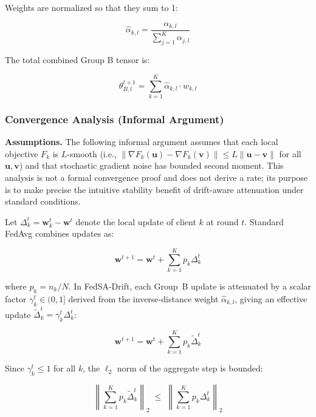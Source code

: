 \documentclass{ieeeaccess}
\newcommand{\sadrift}{FedSA-Drift}
\begin{document}
Weights are normalized so that they sum to 1:

\begin{equation}
\label{eq:norm_weight}
\hat{\alpha}_{k,l} = \frac{\alpha_{k,l}}{\sum_{j=1}^{K} \alpha_{j,l}}
\end{equation}

The total combined Group B tensor is:

\begin{equation}
\label{eq:groupB_agg}
\theta_{B,l}^{t+1} = \sum_{k=1}^{K} \hat{\alpha}_{k,l} \cdot w_{k,l}
\end{equation}

\subsubsection{Convergence Analysis (Informal Argument)}

\noindent\textbf{Assumptions.}
The following informal argument assumes that each local objective $F_k$ is $L$-smooth (i.e., $\|\nabla F_k(\mathbf{u}) - \nabla F_k(\mathbf{v})\| \le L\|\mathbf{u}-\mathbf{v}\|$ for all $\mathbf{u},\mathbf{v}$) and that stochastic gradient noise has bounded second moment. This analysis is not a formal convergence proof and does not derive a rate; its purpose is to make precise the intuitive stability benefit of drift-aware attenuation under standard conditions.

Let $\Delta_k^t = \mathbf{w}_k^t - \mathbf{w}^t$ denote the local update of client $k$ at round $t$. Standard FedAvg combines updates as:

\begin{equation}
\label{eq:fedavg_agg}
\mathbf{w}^{t+1} = \mathbf{w}^t + \sum_{k=1}^{K} p_k \Delta_k^t
\end{equation}

where $p_k = n_k / N$. In \sadrift{}, each Group~B update is attenuated by a scalar factor $\gamma_k^t \in (0,1]$ derived from the inverse-distance weight $\hat{\alpha}_{k,l}$, giving an effective update $\tilde{\Delta}_k^t = \gamma_k^t \Delta_k^t$:

\begin{equation}
\label{eq:sadrift_agg}
\mathbf{w}^{t+1} = \mathbf{w}^t + \sum_{k=1}^{K} p_k \tilde{\Delta}_k^t
\end{equation}

Since $\gamma_k^t \le 1$ for all $k$, the $\ell_2$ norm of the aggregate step is bounded:

\begin{equation}
\label{eq:stability_bound}
\left\|\sum_{k=1}^K p_k \tilde{\Delta}_k^t\right\|_2
\;\le\;
\left\|\sum_{k=1}^K p_k \Delta_k^t\right\|_2
\end{equation}
\end{document}
